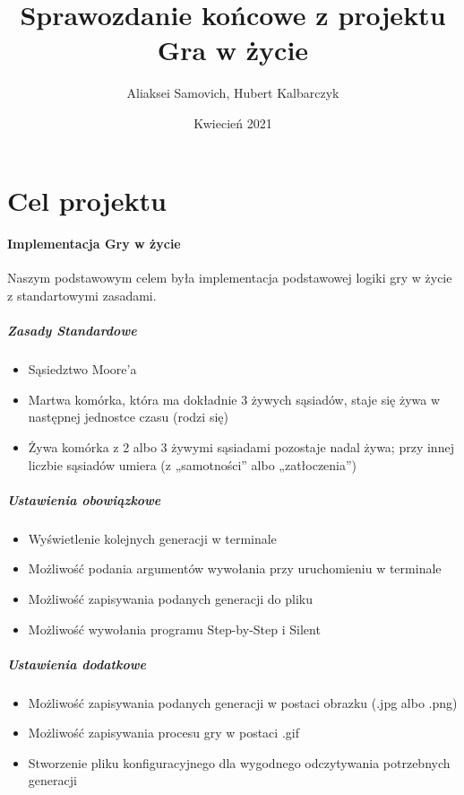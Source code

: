 \documentclass[12pt]{article}
\title{Sprawozdanie końcowe z projektu Gra w życie}
\author{Aliaksei Samovich, Hubert Kalbarczyk}
\date{Kwiecień 2021}
\begin{document}
\maketitle
{}
\newpage
{}

\section{Cel projektu}

\paragraph{Implementacja Gry w życie}

Naszym podstawowym celem była implementacja podstawowej logiki gry w życie z standartowymi zasadami.

\subparagraph{\large Zasady Standardowe}
\begin{itemize}
\item 
Sąsiedztwo Moore’a
    
\item
Martwa komórka, która ma dokładnie 3 żywych sąsiadów, staje się żywa w następnej jednostce czasu (rodzi się)
    
\item
Żywa komórka z 2 albo 3 żywymi sąsiadami pozostaje nadal żywa; przy innej liczbie sąsiadów umiera (z „samotności” albo „zatłoczenia”)
    
\end{itemize}

\subparagraph{\large Ustawienia obowiązkowe}
\begin{itemize}
\item
Wyświetlenie kolejnych generacji w terminale

\item 
Możliwość podania argumentów wywołania przy uruchomieniu w terminale

\item
Możliwość zapisywania podanych generacji do pliku

\item
Możliwość wywołania programu Step-by-Step i Silent

\end{itemize}

\subparagraph{\large Ustawienia dodatkowe}
\begin{itemize}
\item 
Możliwość zapisywania podanych generacji w postaci obrazku (.jpg albo .png) 

\item
Możliwość zapisywania procesu gry w postaci .gif

\item
Stworzenie pliku konfiguracyjnego dla wygodnego odczytywania potrzebnych generacji

\end{itemize}
    
\end{document}
